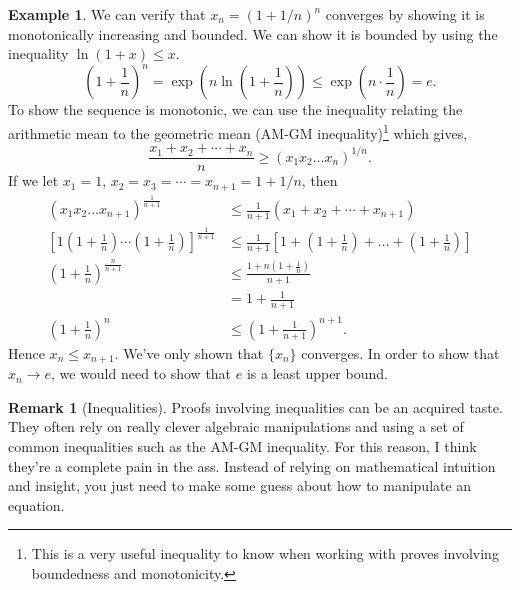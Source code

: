 \documentclass{article}
\theoremstyle{definition}
\newtheorem{example}{Example}[section]
\newtheorem{remark}{Remark}[section]
\begin{document}
	\begin{example}
		We can verify that $ x_n=(1+1/n)^n $ converges by showing it is monotonically increasing and bounded. We can show it is bounded by using the inequality $ \ln(1+x)\le x $. $$\left(1+\frac{1}{n}\right)^n=\exp\left(n\ln\left(1+\frac{1}{n} \right)\right)\le \exp\left(n\cdot\frac{1}{n}\right)=e. $$ To show the sequence is monotonic, we can use the inequality relating the arithmetic mean to the geometric mean (AM-GM inequality)\footnote{This is a very useful inequality to know when working with proves involving boundedness and monotonicity.} which gives, $$ \frac{x_1+x_2+\cdots+x_n}{n}\ge(x_1x_2\ldots x_n)^{1/n}.$$ If we let $ x_1=1 $, $ x_2=x_3=\cdots=x_{n+1}=1+1/n $, then 
		\begin{align*}
			(x_1x_2\ldots x_{n+1})^{\frac{1}{n+1}}&\le \frac{1}{n+1}(x_1+x_2+\cdots+x_{n+1})\\\left[1\left(1+\frac{1}{n}\right)\cdots \left(1+\frac{1}{n}\right)\right]^\frac{1}{n+1}&\le\frac{1}{n+1}\left[1+\left(1+\frac{1}{n}\right)+\ldots + \left(1+\frac{1}{n}\right)\right]\\\left(1+\frac{1}{n}\right)^\frac{n}{n+1}&\le \frac{1+n\left(1+\frac{1}{n}\right)}{n+1}\\&=1+\frac{1}{n+1}\\
			\left(1+\frac{1}{n}\right)^n&\le\left(1+\frac{1}{n+1}\right)^{n+1}.
		\end{align*}
		Hence $ x_n\le x_{n+1} $. We've only shown that $ \{x_n\} $ converges. In order to show that $ x_n\to e $, we would need to show that $ e $ is a least upper bound. 
	\end{example}
	\begin{remark}[Inequalities]
		Proofs involving inequalities can be an acquired taste. They often rely on really clever algebraic manipulations and using a set of common inequalities such as the AM-GM inequality. For this reason, I think they're a complete pain in the ass. Instead of relying on mathematical intuition and insight, you just need to make some guess about how to manipulate an equation. 
	\end{remark}
\end{document}
